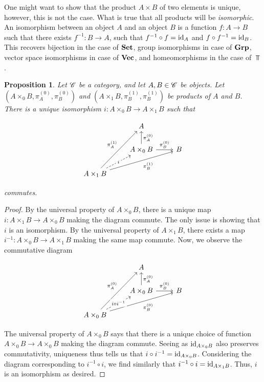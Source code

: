 \documentclass{article}
\newtheorem{proposition}{Proposition}[section]
\theoremstyle{definition}
\numberwithin{figure}{section}
\begin{document}
One might want to show that the product $A\times B$ of two elements is unique, however, this is not the case. What is true that all products will be \textit{isomorphic}. An isomorphism between an object $A$ and an object $B$ is a function $f:A\to B$ such that there exists $f^{-1}:B\to A$, such that $f^{-1}\circ f=\mathrm{id}_{A}$ and $f\circ f^{-1}=\mathrm{id}_B$. This recovers bijection in the case of $\bold{Set}$, group isomorphisms in case of $\bold{Grp}$, vector space isomorphisms in case of $\bold{Vec}$, and homeomorphisms in the case of $\Top$.

\begin{proposition} Let $\mathscr{C}$ be a category, and let $A,B\in \mathscr{C}$ be objects. Let $(A\times_0 B,\pi_A^{(0)},\pi_B^{(0)})$ and $(A\times_1 B,\pi_B^{(1)},\pi_B^{(1)})$ be products of $A$ and $B$. There is a unique isomorphism $i:A\times_0 B\to A\times_1 B$ such that

\[\begin{tikzcd}
	& A \\
	& {A\times_0 B} & B \\
	{A\times _1 B}
	\arrow["{\pi_A^{(0)}}"', from=2-2, to=1-2]
	\arrow["{\pi_B^{(0)}}", from=2-2, to=2-3]
	\arrow["i"{description}, dashed, from=3-1, to=2-2]
	\arrow["{\pi_A^{(1)}}", from=3-1, to=1-2]
	\arrow["{\pi_B^{(1)}}"', from=3-1, to=2-3]
\end{tikzcd}\]

commutes.
\end{proposition}
\begin{proof} By the universal property of $A\times_0 B$, there is a unique map $i: A\times_1 B\to A\times _0 B$ making the diagram commute. The only issue is showing that $i$ is an isomorphism. By the universal property of $A\times _1 B$, there exists a map $i^{-1}:A\times_0 B\to A\times_1 B$ making the same map commute. Now, we observe the commutative diagram

\[\begin{tikzcd}
	& A \\
	& {A\times_0 B} & B \\
	{A\times_0 B}
	\arrow["{\pi_A^{(0)}}"', from=2-2, to=1-2]
	\arrow["{\pi_B^{(0)}}", from=2-2, to=2-3]
	\arrow["{\pi_A^{(0)}}", from=3-1, to=1-2]
	\arrow["{\pi_B^{(0)}}"', from=3-1, to=2-3]
	\arrow["{i\circ i^{-1}}"{description}, dashed, from=3-1, to=2-2]
\end{tikzcd}\]

The universal property of $A\times_0 B$ says that there is a unique choice of function $A\times_0B\to A\times_0 B$ making the diagram commute. Seeing as $\mathrm{id}_{A\times_0 B}$ also preserves commutativity, uniqueness thus tells us that $i\circ i^{-1}=\mathrm{id}_{A\times_0 B}$. Considering the diagram corresponding to $i^{-1}\circ i$, we find similarly that $i^{-1}\circ i=\mathrm{id}_{A\times_1 B}$. Thus, $i$ is an isomorphism as desired.
\end{proof}
\end{document}
